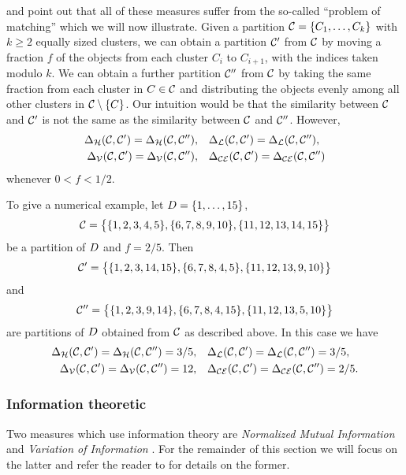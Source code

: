 \citet{meila-2007} and \citet{bae2010comparison} point out that all of these
measures suffer from the so-called ``problem of matching'' which we will now
illustrate.  Given a partition $\mathcal{C}=\{C_1,\dotsc,C_k\}$ with $k\geq 2$
equally sized clusters, we can obtain a partition $\mathcal{C}'$ from $\mathcal{C}$ by
moving a fraction $f$ of the objects from each cluster $C_{i}$ to $C_{i+1}$,
with the indices taken modulo $k$.  We can obtain a further partition
$\mathcal{C}''$ from $\mathcal{C}$ by taking the same fraction from each cluster in $C \in
\mathcal{C}$ and distributing the objects evenly among all other clusters in $\mathcal{C}
\setminus \{C\}$.  Our intuition would be that the similarity between $\mathcal{C}$
and $\mathcal{C}'$ is not the same as the similarity between $\mathcal{C}$ and $\mathcal{C}''$.
However,
\begin{align*}
  \Delta_{\mathcal{H}}(\mathcal{C},\mathcal{C}') = \Delta_{\mathcal{H}}(\mathcal{C},\mathcal{C}''),&\quad
  \Delta_{\mathcal{L}}(\mathcal{C},\mathcal{C}') = \Delta_{\mathcal{L}}(\mathcal{C},\mathcal{C}''),\\
  \Delta_{\mathcal{V}}(\mathcal{C},\mathcal{C}') = \Delta_{\mathcal{V}}(\mathcal{C},\mathcal{C}''),&\quad
  \Delta_{\mathcal{CE}}(\mathcal{C},\mathcal{C}') = \Delta_{\mathcal{CE}}(\mathcal{C},\mathcal{C}'')
\end{align*}
whenever $0< f < 1/2$.

To give a numerical example, let $D = \{1,\dotsc,15\}$,
\begin{equation*}
  \mathcal{C} = \big\{\{1,2,3,4,5\},\{6,7,8,9,10\},\{11,12,13,14,15\}\big\}
\end{equation*}
be a partition of $D$ and $f = 2/5$.  Then
\begin{equation*}
\mathcal{C}' = \big\{\{1,2,3,14,15\},\{6,7,8,4,5\},\{11,12,13,9,10\}\big\}
\end{equation*}
and
\begin{equation*}
\mathcal{C}'' = \big\{\{1,2,3,9,14\},\{6,7,8,4,15\},\{11,12,13,5,10\}\big\}
\end{equation*}
are partitions of $D$ obtained from $\mathcal{C}$ as described above.  In this
case we have
\begin{align*}
  \Delta_{\mathcal{H}}(\mathcal{C},\mathcal{C}') = \Delta_{\mathcal{H}}(\mathcal{C},\mathcal{C}'') = 3/5,&\quad
  \Delta_{\mathcal{L}}(\mathcal{C},\mathcal{C}') = \Delta_{\mathcal{L}}(\mathcal{C},\mathcal{C}'') = 3/5,\\
  \Delta_{\mathcal{V}}(\mathcal{C},\mathcal{C}') = \Delta_{\mathcal{V}}(\mathcal{C},\mathcal{C}'') = 12,&\quad
  \Delta_{\mathcal{CE}}(\mathcal{C},\mathcal{C}') = \Delta_{\mathcal{CE}}(\mathcal{C},\mathcal{C}'') = 2/5.
\end{align*}

\subsubsection{Information theoretic}
\label{sec:inform-theor}

Two measures which use information theory are \textit{Normalized Mutual
  Information} \citep{fred-jain-2003} and \textit{Variation of Information}
\citep{meila-2007}.  For the remainder of this section we will focus on the
latter and refer the reader to \citep{fred-jain-2003} for details on the
former.


